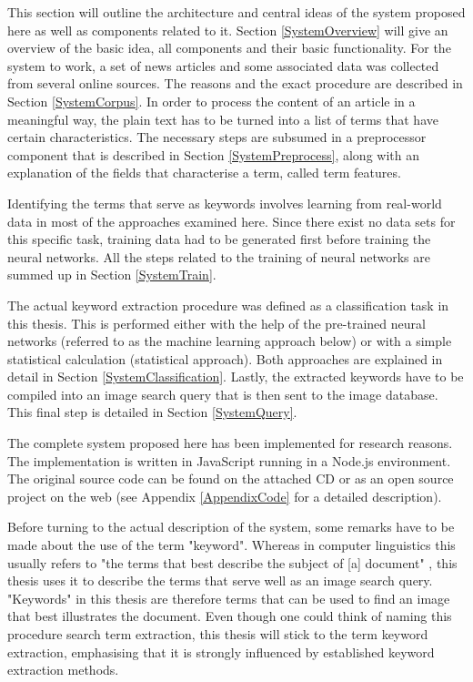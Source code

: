 \documentclass[11pt,a4paper,twoside]{article}
\begin{document}
This section will outline the architecture and central ideas of the system proposed here as well as components related to it. Section \ref{SystemOverview} will give an overview of the basic idea, all components and their basic functionality. For the system to work, a set of news articles and some associated data was collected from several online sources. The reasons and the exact procedure are described in Section \ref{SystemCorpus}. In order to process the content of an article in a meaningful way, the plain text has to be turned into a list of terms that have certain characteristics. The necessary steps are subsumed in a preprocessor component that is described in Section \ref{SystemPreprocess}, along with an explanation of the fields that characterise a term, called term features.

Identifying the terms that serve as keywords involves learning from real-world data in most of the approaches examined here. Since there exist no data sets for this specific task, training data had to be generated first before training the neural networks. All the steps related to the training of neural networks are summed up in Section \ref{SystemTrain}.

The actual keyword extraction procedure was defined as a classification task in this thesis. This is performed either with the help of the pre-trained neural networks (referred to as the machine learning approach below) or with a simple statistical calculation (statistical approach). Both approaches are explained in detail in Section \ref{SystemClassification}. Lastly, the extracted keywords have to be compiled into an image search query that is then sent to the image database. This final step is detailed in Section \ref{SystemQuery}.

The complete system proposed here has been implemented for research reasons. The implementation is written in JavaScript running in a Node.js environment. The original source code can be found on the attached CD or as an open source project on the web (see Appendix \ref{AppendixCode} for a detailed description).

Before turning to the actual description of the system, some remarks have to be made about the use of the term "keyword". Whereas in computer linguistics this usually refers to "the terms that best describe the subject of [a] document" \cite[p. 1]{Beliga2014KeywordApproaches}, this thesis uses it to describe the terms that serve well as an image search query. "Keywords" in this thesis are therefore terms that can be used to find an image that best illustrates the document. Even though one could think of naming this procedure search term extraction, this thesis will stick to the term keyword extraction, emphasising that it is strongly influenced by established keyword extraction methods.
\end{document}

